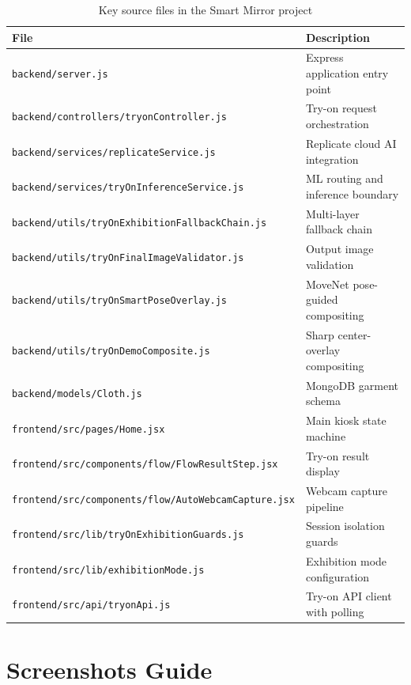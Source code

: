 \begin{table}[H]
  \centering
  \caption{Key source files in the Smart Mirror project}
  \label{tab:source-files}
  \small
  \begin{tabular}{@{}lp{9cm}@{}}
    \toprule
    \textbf{File} & \textbf{Description} \\
    \midrule
    \texttt{backend/server.js} & Express application entry point \\
    \texttt{backend/controllers/tryonController.js} & Try-on request orchestration \\
    \texttt{backend/services/replicateService.js} & Replicate cloud AI integration \\
    \texttt{backend/services/tryOnInferenceService.js} & ML routing and inference boundary \\
    \texttt{backend/utils/tryOnExhibitionFallbackChain.js} & Multi-layer fallback chain \\
    \texttt{backend/utils/tryOnFinalImageValidator.js} & Output image validation \\
    \texttt{backend/utils/tryOnSmartPoseOverlay.js} & MoveNet pose-guided compositing \\
    \texttt{backend/utils/tryOnDemoComposite.js} & Sharp center-overlay compositing \\
    \texttt{backend/models/Cloth.js} & MongoDB garment schema \\
    \texttt{frontend/src/pages/Home.jsx} & Main kiosk state machine \\
    \texttt{frontend/src/components/flow/FlowResultStep.jsx} & Try-on result display \\
    \texttt{frontend/src/components/flow/AutoWebcamCapture.jsx} & Webcam capture pipeline \\
    \texttt{frontend/src/lib/tryOnExhibitionGuards.js} & Session isolation guards \\
    \texttt{frontend/src/lib/exhibitionMode.js} & Exhibition mode configuration \\
    \texttt{frontend/src/api/tryonApi.js} & Try-on API client with polling \\
    \bottomrule
  \end{tabular}
\end{table}

\section{Screenshots Guide}
\label{app:screenshots}

